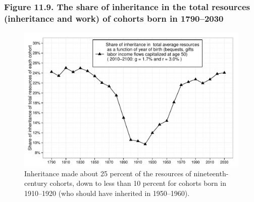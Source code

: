 \documentclass[t]{beamer}\usepackage[]{graphicx}\usepackage[]{color}
\newenvironment{knitrout}{}{} %
\begin{document}
\begin{frame}[label=Figure_11_9]
\frametitle{Figure 11.9. The share of inheritance in the total resources (inheritance and work) of cohorts born in 1790--2030}
\begin{figure}[t]
\begin{minipage}[b]{\textwidth}
\centering
\begin{knitrout}\footnotesize
{}\color{fgcolor}

{\centering \includegraphics[width=1\linewidth]{figures/bw/Figure_11_9} 

}



\end{knitrout}
\caption{Inheritance made about 25 percent of the resources of nineteenth-century cohorts, down to less than 10 percent for cohorts born in 1910--1920 (who should have inherited in 1950--1960).}
\end{minipage}
\end{figure}
\end{frame}
\end{document}
